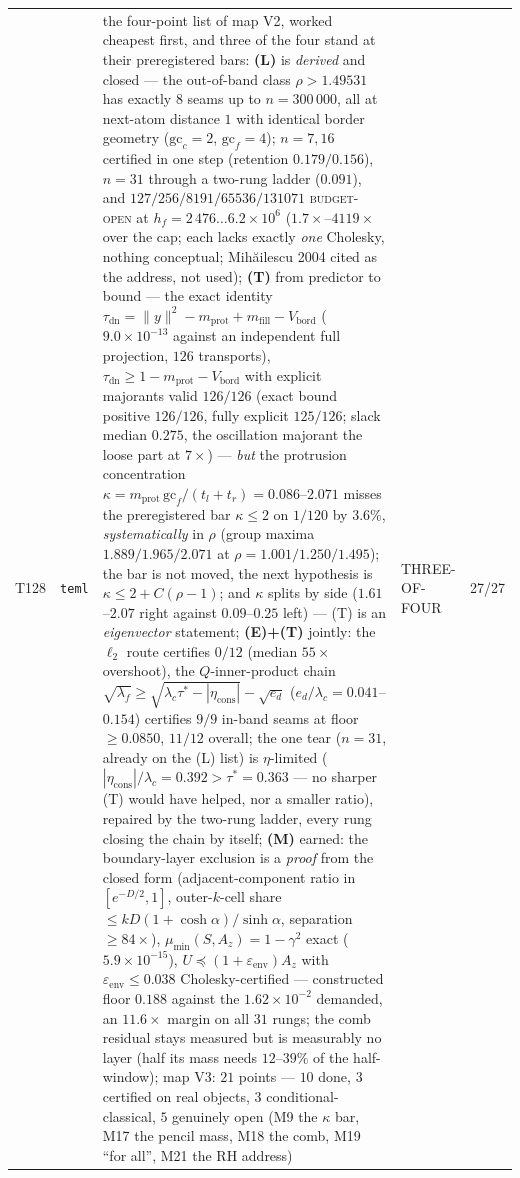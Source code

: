 \documentclass[11pt,a4paper]{article}
\begin{document}
{\begin{xltabular}{\linewidth}{@{}p{0.95cm} >{\raggedright\arraybackslash}p{3.1cm} Y >{\raggedright\scriptsize\arraybackslash}p{3.35cm} p{1.15cm}@{}}
T128 & \texttt{\scriptsize teml} & the four-point list of map V2, worked cheapest first, and three of the four stand at their preregistered bars: \textbf{(L)} is \emph{derived} and closed --- the out-of-band class $\rho>1.49531$ has exactly $8$ seams up to $n=300\,000$, all at next-atom distance $1$ with identical border geometry ($\mathrm{gc}_c=2$, $\mathrm{gc}_f=4$); $n=7,16$ certified in one step (retention $0.179/0.156$), $n=31$ through a two-rung ladder ($0.091$), and $127/256/8191/65536/131071$ \textsc{budget-open} at $h_f=2\,476\ldots6.2\times10^{6}$ ($1.7\times$--$4119\times$ over the cap; each lacks exactly \emph{one} Cholesky, nothing conceptual; Mih\u{a}ilescu 2004 cited as the address, not used); \textbf{(T)} from predictor to bound --- the exact identity $\tau_{\mathrm{dn}}=\|y\|^2-m_{\mathrm{prot}}+m_{\mathrm{fill}}-V_{\mathrm{bord}}$ ($9.0\times10^{-13}$ against an independent full projection, $126$ transports), $\tau_{\mathrm{dn}}\ge1-m_{\mathrm{prot}}-V_{\mathrm{bord}}$ with explicit majorants valid $126/126$ (exact bound positive $126/126$, fully explicit $125/126$; slack median $0.275$, the oscillation majorant the loose part at $7\times$) --- \emph{but} the protrusion concentration $\kappa=m_{\mathrm{prot}}\,\mathrm{gc}_f/(t_l+t_r)=0.086$--$2.071$ misses the preregistered bar $\kappa\le2$ on $1/120$ by $3.6\%$, \emph{systematically} in $\rho$ (group maxima $1.889/1.965/2.071$ at $\rho=1.001/1.250/1.495$); the bar is not moved, the next hypothesis is $\kappa\le2+C(\rho-1)$; and $\kappa$ splits by side ($1.61$--$2.07$ right against $0.09$--$0.25$ left) --- (T) is an \emph{eigenvector} statement; \textbf{(E)+(T)} jointly: the $\ell_2$ route certifies $0/12$ (median $55\times$ overshoot), the $Q$-inner-product chain $\sqrt{\lambda_f}\ge\sqrt{\lambda_c\tau^*-|\eta_{\mathrm{cons}}|}-\sqrt{e_d}$ ($e_d/\lambda_c=0.041$--$0.154$) certifies $9/9$ in-band seams at floor $\ge0.0850$, $11/12$ overall; the one tear ($n=31$, already on the (L) list) is $\eta$-limited ($|\eta_{\mathrm{cons}}|/\lambda_c=0.392>\tau^*=0.363$ --- no sharper (T) would have helped, nor a smaller ratio), repaired by the two-rung ladder, every rung closing the chain by itself; \textbf{(M)} earned: the boundary-layer exclusion is a \emph{proof} from the closed form (adjacent-component ratio in $[e^{-D/2},1]$, outer-$k$-cell share $\le kD(1+\cosh\alpha)/\sinh\alpha$, separation $\ge84\times$), $\mu_{\min}(S,A_z)=1-\gamma^2$ exact ($5.9\times10^{-15}$), $U\preceq(1+\varepsilon_{\mathrm{env}})A_z$ with $\varepsilon_{\mathrm{env}}\le0.038$ Cholesky-certified --- constructed floor $0.188$ against the $1.62\times10^{-2}$ demanded, an $11.6\times$ margin on all $31$ rungs; the comb residual stays measured but is measurably no layer (half its mass needs $12$--$39\%$ of the half-window); map V3: $21$ points --- $10$ done, $3$ certified on real objects, $3$ conditional-classical, $5$ genuinely open (M9 the $\kappa$ bar, M17 the pencil mass, M18 the comb, M19 ``for all'', M21 the RH address) & THREE-OF-FOUR & 27/27\\

\end{xltabular}}
\end{document}
